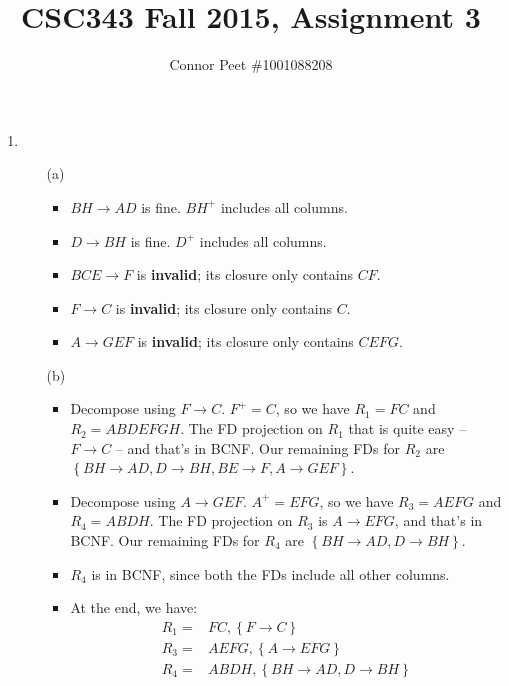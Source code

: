 \documentclass{article}
\title{CSC343 Fall 2015, Assignment 3}
\author{Connor Peet \#1001088208}
\begin{document}
\maketitle

\begin{enumerate}
\item
    \begin{enumerate}
    \item [(a)]
        \begin{itemize}
        \item $BH \rightarrow AD$ is fine. $BH^+$ includes all columns.
        \item $D \rightarrow BH$ is fine. $D^+$ includes all columns.
        \item $BCE \rightarrow F$ is \textbf{invalid}; its closure only contains $CF$.
        \item $F \rightarrow C$ is \textbf{invalid}; its closure only contains $C$.
        \item $A \rightarrow GEF$ is \textbf{invalid}; its closure only contains $CEFG$.
        \end{itemize}
    \item [(b)]
        \begin{itemize}
        \item Decompose using $F \rightarrow C$. $F^+ = C$, so we have $R_1 = FC$ and $R_2 = ABDEFGH$. The FD projection on $R_1$ that is quite easy -- $F \rightarrow C$ -- and that's in BCNF. Our remaining FDs for $R_2$ are $\left\{BH \rightarrow AD, D \rightarrow BH, BE \rightarrow F, A \rightarrow GEF \right\}$.
        \item Decompose using $A \rightarrow GEF$. $A^+ = EFG$, so we have $R_3 = AEFG$ and $R_4 = ABDH$. The FD projection on $R_3$ is $A \rightarrow EFG$, and that's in BCNF. Our remaining FDs for $R_4$ are $\left\{BH \rightarrow AD, D \rightarrow BH \right\}$.
        \item $R_4$ is in BCNF, since both the FDs include all other columns.
        \item At the end, we have:
            \begin{equation*}
            \begin{aligned}
            R_1 =& FC, \left\{F \rightarrow C \right\} \\
            R_3 =& AEFG, \left\{A \rightarrow EFG \right\} \\
            R_4 =& ABDH, \left\{BH \rightarrow AD, D \rightarrow BH \right\} \\
            \end{aligned}

\end{equation*}
\end{itemize}
\end{enumerate}
\end{enumerate}
\end{document}
